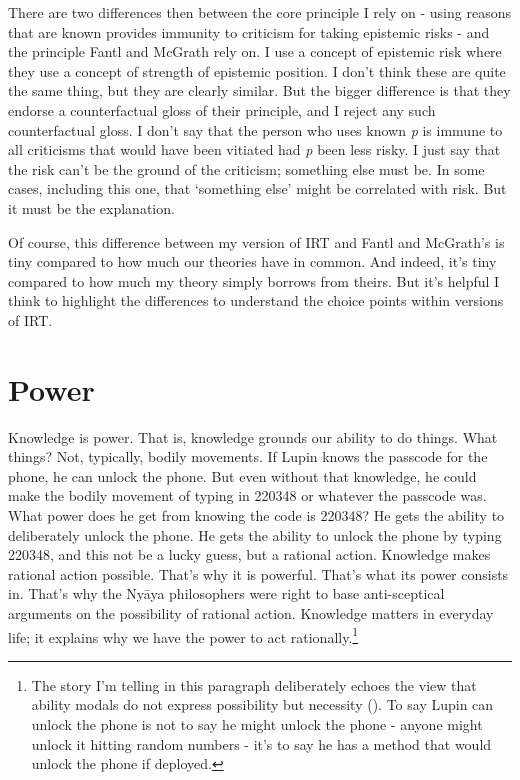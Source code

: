 \documentclass[
  10pt,
  letterpaper,
  twoside]{scrbook}
\begin{document}
There are two differences then between the core principle I rely on -
using reasons that are known provides immunity to criticism for taking
epistemic risks - and the principle Fantl and McGrath rely on. I use a
concept of epistemic risk where they use a concept of strength of
epistemic position. I don't think these are quite the same thing, but
they are clearly similar. But the bigger difference is that they endorse
a counterfactual gloss of their principle, and I reject any such
counterfactual gloss. I don't say that the person who uses known
\emph{p} is immune to all criticisms that would have been vitiated had
\emph{p} been less risky. I just say that the risk can't be the ground
of the criticism; something else must be. In some cases, including this
one, that `something else' might be correlated with risk. But it must be
the explanation.

Of course, this difference between my version of IRT and Fantl and
McGrath's is tiny compared to how much our theories have in common. And
indeed, it's tiny compared to how much my theory simply borrows from
theirs. But it's helpful I think to highlight the differences to
understand the choice points within versions of IRT.


\chapter{Power}\label{sec-power}

Knowledge is power. That is, knowledge grounds our ability to do things.
What things? Not, typically, bodily movements. If Lupin knows the
passcode for the phone, he can unlock the phone. But even without that
knowledge, he could make the bodily movement of typing in 220348 or
whatever the passcode was. What power does he get from knowing the code
is 220348? He gets the ability to deliberately unlock the phone. He gets
the ability to unlock the phone by typing 220348, and this not be a
lucky guess, but a rational action. Knowledge makes rational action
possible. That's why it is powerful. That's what its power consists in.
That's why the Nyāya philosophers were right to base anti-sceptical
arguments on the possibility of rational action. Knowledge matters in
everyday life; it explains why we have the power to act
rationally.\footnote{The story I'm telling in this paragraph
  deliberately echoes the view that ability modals do not express
  possibility but necessity
  (). To say Lupin can unlock the phone is not to say he might
  unlock the phone - anyone might unlock it hitting random numbers -
  it's to say he has a method that would unlock the phone if deployed.}
\end{document}
